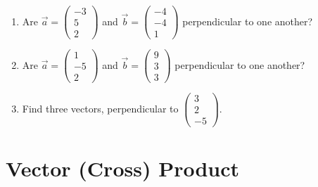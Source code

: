 \documentclass[12pt,eng]{skript_ogg}
\begin{document}
\begin{uebung}
\begin{enumerate}[\bfseries 1.]
	\item Are $\vec{a}=\begin{pmatrix} -3\\5\\2 \end{pmatrix}$ and $\vec{b}=\begin{pmatrix} -4\\-4\\1 \end{pmatrix}$ perpendicular to one another?
	
	\vspace{2.4cm}
	
	\item Are $\vec{a}=\begin{pmatrix} 1\\-5\\2\end{pmatrix}$ and $\vec{b}=\begin{pmatrix} 9\\3\\3\end{pmatrix}$ perpendicular to one another?
	
	\vspace{2.4cm}
	
	\item Find three vectors, perpendicular to $\begin{pmatrix}3\\2\\-5\end{pmatrix}$.
	
	\vspace{2.4cm}
	
\end{enumerate}
\end{uebung}

\section{Vector (Cross) Product}
\end{document}
